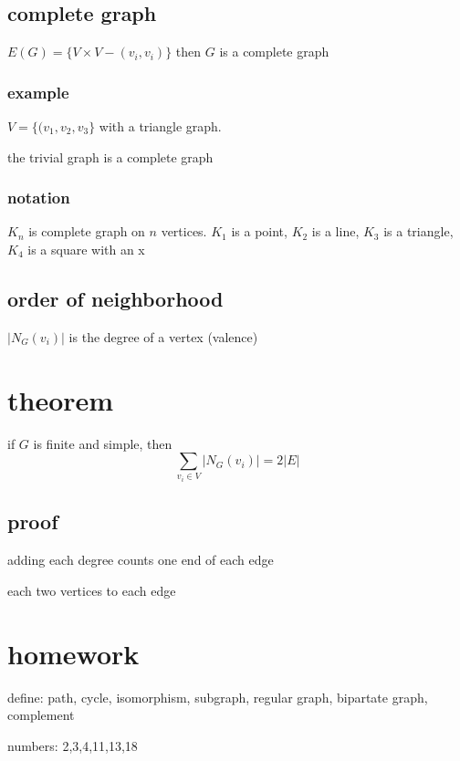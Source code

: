 \documentclass[letterpaper]{article}
\begin{document}
\subsection*{complete graph}
$E(G)=\{V\times V-(v_i,v_i)\}$ then $G$ is a complete graph
\subsubsection*{example}
$V=\{(v_1,v_2,v_3\}$ with a triangle graph.

the trivial graph is a complete graph

\subsubsection*{notation}
$K_n$ is complete graph  on $n$ vertices. 
$K_1$ is a point, $K_2$ is a line, $K_3$ is a triangle, $K_4$ is a square with an x

\subsection*{order of neighborhood}
$|N_G(v_i)|$ is the degree of a vertex (valence)

\section*{theorem}
if $G$ is finite and simple, then 
\[\sum\limits_{v_i\in V}{|N_G(v_i)|}=2|E|\]
\subsection*{proof}
adding each degree counts one end of each edge

each two vertices to each edge

\section*{homework}
define: path, cycle, isomorphism, subgraph, regular graph, bipartate graph, complement

numbers: 2,3,4,11,13,18
\end{document}
